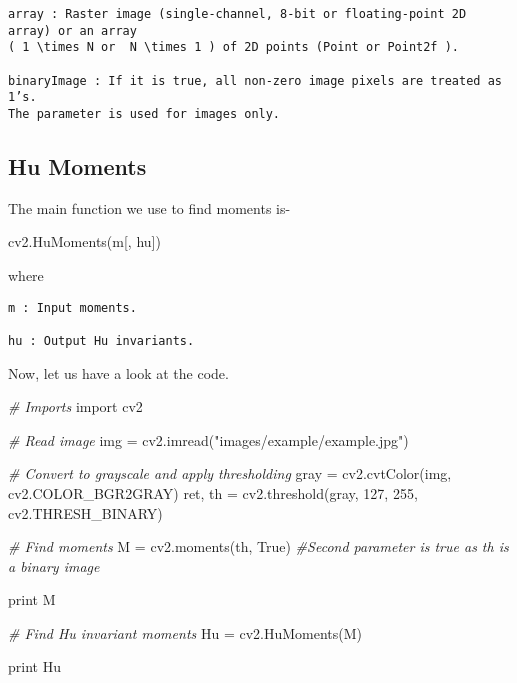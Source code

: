 \documentclass[]{article}
\newenvironment{Shaded}{}{}
\newcommand{\DecValTok}[1]{\textcolor[rgb]{0.25,0.63,0.44}{{#1}}}
\newcommand{\StringTok}[1]{\textcolor[rgb]{0.25,0.44,0.63}{{#1}}}
\newcommand{\ImportTok}[1]{{#1}}
\newcommand{\CommentTok}[1]{\textcolor[rgb]{0.38,0.63,0.69}{\textit{{#1}}}}
\newcommand{\VariableTok}[1]{\textcolor[rgb]{0.10,0.09,0.49}{{#1}}}
\newcommand{\OperatorTok}[1]{\textcolor[rgb]{0.40,0.40,0.40}{{#1}}}
\newcommand{\BuiltInTok}[1]{{#1}}
\newcommand{\NormalTok}[1]{{#1}}
\begin{document}
\begin{verbatim}
array : Raster image (single-channel, 8-bit or floating-point 2D array) or an array 
( 1 \times N or  N \times 1 ) of 2D points (Point or Point2f ).

binaryImage : If it is true, all non-zero image pixels are treated as 1’s. 
The parameter is used for images only.
\end{verbatim}

\subsection{Hu Moments}\label{hu-moments}

The main function we use to find moments is-

\begin{Shaded}
\begin{Highlighting}[]
    \NormalTok{cv2.HuMoments(m[, hu])}
\end{Highlighting}
\end{Shaded}

where

\begin{verbatim}
m : Input moments.

hu : Output Hu invariants.
\end{verbatim}

Now, let us have a look at the code.

\begin{Shaded}
\begin{Highlighting}[]
\CommentTok{# Imports}
\ImportTok{import} \NormalTok{cv2}

\CommentTok{# Read image}
\NormalTok{img }\OperatorTok{=} \NormalTok{cv2.imread(}\StringTok{"images/example/example.jpg"}\NormalTok{)}

\CommentTok{# Convert to grayscale and apply thresholding}
\NormalTok{gray }\OperatorTok{=} \NormalTok{cv2.cvtColor(img, cv2.COLOR_BGR2GRAY)}
\NormalTok{ret, th }\OperatorTok{=} \NormalTok{cv2.threshold(gray, }\DecValTok{127}\NormalTok{, }\DecValTok{255}\NormalTok{, cv2.THRESH_BINARY)}

\CommentTok{# Find moments}
\NormalTok{M }\OperatorTok{=} \NormalTok{cv2.moments(th, }\VariableTok{True}\NormalTok{) }\CommentTok{#Second parameter is true as th is a binary image}

\BuiltInTok{print} \NormalTok{M}

\CommentTok{# Find Hu invariant moments}
\NormalTok{Hu }\OperatorTok{=} \NormalTok{cv2.HuMoments(M)}

\BuiltInTok{print} \NormalTok{Hu}
\end{Highlighting}
\end{Shaded}
\end{document}
